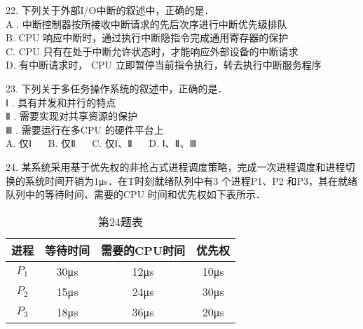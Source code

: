 22. 下列关于外部I/O中断的叙述中，正确的是． \\
A . 中断控制器按所接收中断请求的先后次序进行中断优先级排队 \\
B. CPU 响应中断时，通过执行中断隐指令完成通用寄存器的保护 \\
C. CPU 只有在处于中断允许状态时，才能响应外部设备的中断请求 \\
D. 有中断请求时， CPU 立即暂停当前指令执行，转去执行中断服务程序

23. 下列关于多任务操作系统的叙述中，正确的是． \\
Ⅰ . 具有并发和并行的特点 \\
Ⅱ . 需要实现对共享资源的保护 \\
Ⅲ . 需要运行在多CPU 的硬件平台上 \\
A. 仅Ⅰ $\quad$ B. 仅Ⅱ $\quad$ C. 仅Ⅰ、Ⅱ $\quad$ D. Ⅰ、Ⅱ、Ⅲ

24. 某系统采用基于优先权的非抢占式进程调度策略，完成一次进程调度和进程切换的系统时间开销为1μs．在T时刻就绪队列中有3 个进程P1、P2 和P3，其在就绪队列中的等待时间、需要的CPU 时间和优先权如下表所示．
\begin{table}[ht]
\centering
\caption{第24题表}\label{CSN18_tab1}
\begin{tabular}{|c|c|c|c|}
\hline
进程 & 等待时间 & 需要的CPU时间 & 优先权 \\
\hline
$P_1$ & 30μs & 12μs & 10μs \\
\hline
$P_2$ & 15μs & 24μs & 30μs \\
\hline
$P_3$ & 18μs & 36μs & 20μs \\
\hline
\end{tabular}
\end{table}

